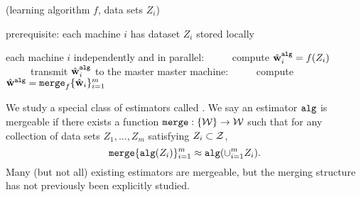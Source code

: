 \documentclass[thesis.tex]{subfiles}
\newcommand{\merge}{\mkprocedure{merge}}
\newcommand{\alg}{\mkprocedure{alg}}
\newcommand{\alglocal}{\mkprocedure{alg\_local}}
\newcommand{\Wlocal}{{\W^\textit{local}}}
\newcommand{\walg}{{\hat\w^{\alg}}}
\begin{document}
\begin{algorithm}[t]
    \caption{(learning algorithm $f$, data sets $Z_i$)}
    \label{alg:dist}
    \vspace{0.1in}
    prerequisite: each machine $i$ has dataset $Z_i$ stored locally
    \begin{algorithmic}[1]
        \State each machine $i$ independently and in parallel:
        \State ~~~~~compute $\walg_i = f(Z_i)$
        \State ~~~~~transmit $\walg_i$ to the master
        \State master machine:
        \State ~~~~~compute $\walg = \merge_f\{\what_i\}_{i=1}^m$
    \end{algorithmic}
\end{algorithm}

We study a special class of estimators called .
We say an estimator $\alg$ is mergeable if there exists a function $\merge : \{\W\} \to \W$ such that
for any collection of data sets $Z_1,...,Z_m$ satisfying $Z_i\subset{\mathcal Z}$,
\begin{equation}
    \label{eq:notation:merge}
    \merge\{\alg(Z_i)\}_{i=1}^m \approx \alg(\cup_{i=1}^m Z_i)
    .
\end{equation}
Many (but not all) existing estimators are mergeable,
but the merging structure has not previously been explicitly studied.%
\end{document}
